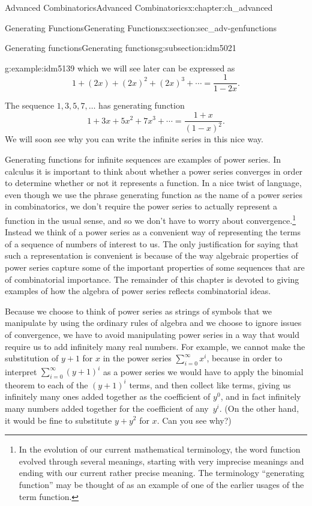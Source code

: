 \documentclass[oneside,10pt,]{book}
\numberwithin{equation}{chapter}
\begin{document}
\begin{chapterptx}{Advanced Combinatorics}{}{Advanced Combinatorics}{}{}{x:chapter:ch_advanced}
\begin{sectionptx}{Generating Functions}{}{Generating Functions}{}{}{x:section:sec_adv-genfunctions}
\begin{subsectionptx}{Generating functions}{}{Generating functions}{}{}{g:subsection:idm5021}
\begin{example}{}{g:example:idm5139}
which we will see later can be expressed as%
\begin{equation*}
1+(2x) + (2x)^2 + (2x)^3 + \cdots = \frac{1}{1-2x}\text{.}
\end{equation*}
%
\par
The sequence \(1, 3, 5, 7,\ldots\) has generating function%
\begin{equation*}
1+3x + 5x^2 +7x^3 + \cdots = \frac{1+x}{(1-x)^2}\text{.}
\end{equation*}
We will soon see why you can write the infinite series in this nice way.%
\end{example}
Generating functions for infinite sequences are examples of power series. In calculus it is important to think about whether a power series converges in order to determine whether or not it represents a function. In a nice twist of language, even though we use the phrase generating function as the name of a power series in combinatorics, we don't require the power series to actually represent a function in the usual sense, and so we don't have to worry about convergence.\footnote{In the evolution of our current mathematical terminology, the word function evolved through several meanings, starting with very imprecise meanings and ending with our current rather precise meaning.  The terminology ``generating function'' may be thought of as an example of one of the earlier usages of the term function.\label{g:fn:idm5149}} Instead we think of a power series as a convenient way of representing the terms of a sequence of numbers of interest to us. The only justification for saying that such a representation is convenient is because of the way algebraic properties of power series capture some of the important properties of some sequences that are of combinatorial importance. The remainder of this chapter is devoted to giving examples of how the algebra of power series reflects combinatorial ideas.%
\par
Because we choose to think of power series as strings of symbols that we manipulate by using the ordinary rules of algebra and we choose to ignore issues of convergence, we have to avoid manipulating power series in a way that would require us to add infinitely many real numbers. For example, we cannot make the substitution of \(y+1\) for \(x\) in the power series \(\sum_{i=0}^\infty x^i\), because in order to interpret \(\sum_{i=0}^\infty (y+1)^i\) as a power series we would have to apply the binomial theorem to each of the \((y+1)^i\) terms, and then collect like terms, giving us infinitely many ones added together as the coefficient of \(y^0\), and in fact infinitely many numbers added together for the coefficient of any~\(y^i\). (On the other hand, it would be fine to substitute \(y+y^2\) for \(x\). Can you see why?)%

\end{subsectionptx}
\end{sectionptx}
\end{chapterptx}
\end{document}
